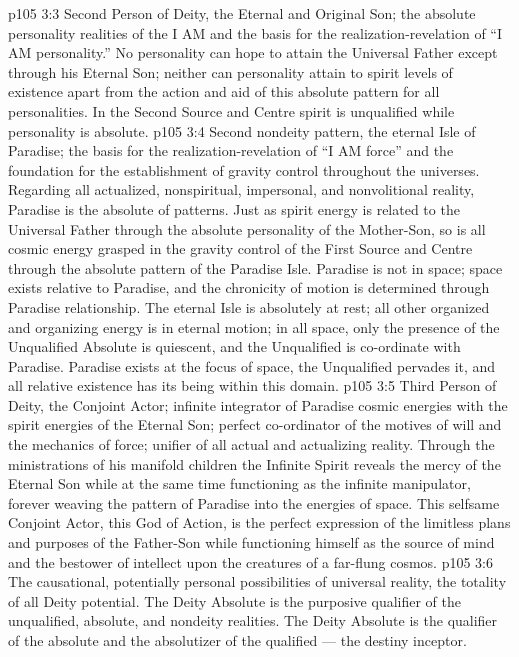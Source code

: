 \vs p105 3:3 \bibnobreakspace {} Second Person of Deity, the Eternal and Original Son; the absolute personality realities of the I AM and the basis for the realization\hyp{}revelation of “I AM personality.” No personality can hope to attain the Universal Father except through his Eternal Son; neither can personality attain to spirit levels of existence apart from the action and aid of this absolute pattern for all personalities. In the Second Source and Centre spirit is unqualified while personality is absolute.
\vs p105 3:4 \bibnobreakspace {} Second nondeity pattern, the eternal Isle of Paradise; the basis for the realization\hyp{}revelation of “I AM force” and the foundation for the establishment of gravity control throughout the universes. Regarding all actualized, nonspiritual, impersonal, and nonvolitional reality, Paradise is the absolute of patterns. Just as spirit energy is related to the Universal Father through the absolute personality of the Mother\hyp{}Son, so is all cosmic energy grasped in the gravity control of the First Source and Centre through the absolute pattern of the Paradise Isle. Paradise is not in space; space exists relative to Paradise, and the chronicity of motion is determined through Paradise relationship. The eternal Isle is absolutely at rest; all other organized and organizing energy is in eternal motion; in all space, only the presence of the Unqualified Absolute is quiescent, and the Unqualified is co\hyp{}ordinate with Paradise. Paradise exists at the focus of space, the Unqualified pervades it, and all relative existence has its being within this domain.
\vs p105 3:5 \bibnobreakspace {} Third Person of Deity, the Conjoint Actor; infinite integrator of Paradise cosmic energies with the spirit energies of the Eternal Son; perfect co\hyp{}ordinator of the motives of will and the mechanics of force; unifier of all actual and actualizing reality. Through the ministrations of his manifold children the Infinite Spirit reveals the mercy of the Eternal Son while at the same time functioning as the infinite manipulator, forever weaving the pattern of Paradise into the energies of space. This selfsame Conjoint Actor, this God of Action, is the perfect expression of the limitless plans and purposes of the Father\hyp{}Son while functioning himself as the source of mind and the bestower of intellect upon the creatures of a far\hyp{}flung cosmos.
\vs p105 3:6 \bibnobreakspace {} The causational, potentially personal possibilities of universal reality, the totality of all Deity potential. The Deity Absolute is the purposive qualifier of the unqualified, absolute, and nondeity realities. The Deity Absolute is the qualifier of the absolute and the absolutizer of the qualified --- the destiny inceptor.
